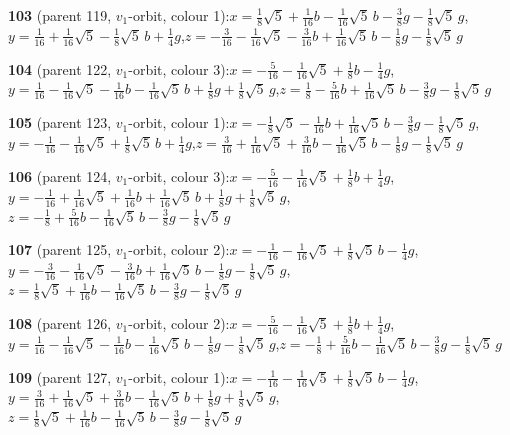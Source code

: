 \documentclass[10pt]{article}
\begin{document}
{\noindent\textbf{103} (parent 119, $v_1$-orbit, colour 1):\quad $x=\tfrac{1}{8}\sqrt5+\tfrac{1}{16}b-\tfrac{1}{16}\sqrt5\,b-\tfrac{3}{8}g-\tfrac{1}{8}\sqrt5\,g$,\quad $y=\tfrac{1}{16}+\tfrac{1}{16}\sqrt5-\tfrac{1}{8}\sqrt5\,b+\tfrac{1}{4}g$,\quad $z=-\tfrac{3}{16}-\tfrac{1}{16}\sqrt5-\tfrac{3}{16}b+\tfrac{1}{16}\sqrt5\,b-\tfrac{1}{8}g-\tfrac{1}{8}\sqrt5\,g$\par\smallskip
\noindent\textbf{104} (parent 122, $v_1$-orbit, colour 3):\quad $x=-\tfrac{5}{16}-\tfrac{1}{16}\sqrt5+\tfrac{1}{8}b-\tfrac{1}{4}g$,\quad $y=\tfrac{1}{16}-\tfrac{1}{16}\sqrt5-\tfrac{1}{16}b-\tfrac{1}{16}\sqrt5\,b+\tfrac{1}{8}g+\tfrac{1}{8}\sqrt5\,g$,\quad $z=\tfrac{1}{8}-\tfrac{5}{16}b+\tfrac{1}{16}\sqrt5\,b-\tfrac{3}{8}g-\tfrac{1}{8}\sqrt5\,g$\par\smallskip
\noindent\textbf{105} (parent 123, $v_1$-orbit, colour 1):\quad $x=-\tfrac{1}{8}\sqrt5-\tfrac{1}{16}b+\tfrac{1}{16}\sqrt5\,b-\tfrac{3}{8}g-\tfrac{1}{8}\sqrt5\,g$,\quad $y=-\tfrac{1}{16}-\tfrac{1}{16}\sqrt5+\tfrac{1}{8}\sqrt5\,b+\tfrac{1}{4}g$,\quad $z=\tfrac{3}{16}+\tfrac{1}{16}\sqrt5+\tfrac{3}{16}b-\tfrac{1}{16}\sqrt5\,b-\tfrac{1}{8}g-\tfrac{1}{8}\sqrt5\,g$\par\smallskip
\noindent\textbf{106} (parent 124, $v_1$-orbit, colour 3):\quad $x=-\tfrac{5}{16}-\tfrac{1}{16}\sqrt5+\tfrac{1}{8}b+\tfrac{1}{4}g$,\quad $y=-\tfrac{1}{16}+\tfrac{1}{16}\sqrt5+\tfrac{1}{16}b+\tfrac{1}{16}\sqrt5\,b+\tfrac{1}{8}g+\tfrac{1}{8}\sqrt5\,g$,\quad $z=-\tfrac{1}{8}+\tfrac{5}{16}b-\tfrac{1}{16}\sqrt5\,b-\tfrac{3}{8}g-\tfrac{1}{8}\sqrt5\,g$\par\smallskip
\noindent\textbf{107} (parent 125, $v_1$-orbit, colour 2):\quad $x=-\tfrac{1}{16}-\tfrac{1}{16}\sqrt5+\tfrac{1}{8}\sqrt5\,b-\tfrac{1}{4}g$,\quad $y=-\tfrac{3}{16}-\tfrac{1}{16}\sqrt5-\tfrac{3}{16}b+\tfrac{1}{16}\sqrt5\,b-\tfrac{1}{8}g-\tfrac{1}{8}\sqrt5\,g$,\quad $z=\tfrac{1}{8}\sqrt5+\tfrac{1}{16}b-\tfrac{1}{16}\sqrt5\,b-\tfrac{3}{8}g-\tfrac{1}{8}\sqrt5\,g$\par\smallskip
\noindent\textbf{108} (parent 126, $v_1$-orbit, colour 2):\quad $x=-\tfrac{5}{16}-\tfrac{1}{16}\sqrt5+\tfrac{1}{8}b+\tfrac{1}{4}g$,\quad $y=\tfrac{1}{16}-\tfrac{1}{16}\sqrt5-\tfrac{1}{16}b-\tfrac{1}{16}\sqrt5\,b-\tfrac{1}{8}g-\tfrac{1}{8}\sqrt5\,g$,\quad $z=-\tfrac{1}{8}+\tfrac{5}{16}b-\tfrac{1}{16}\sqrt5\,b-\tfrac{3}{8}g-\tfrac{1}{8}\sqrt5\,g$\par\smallskip
\noindent\textbf{109} (parent 127, $v_1$-orbit, colour 1):\quad $x=-\tfrac{1}{16}-\tfrac{1}{16}\sqrt5+\tfrac{1}{8}\sqrt5\,b-\tfrac{1}{4}g$,\quad $y=\tfrac{3}{16}+\tfrac{1}{16}\sqrt5+\tfrac{3}{16}b-\tfrac{1}{16}\sqrt5\,b+\tfrac{1}{8}g+\tfrac{1}{8}\sqrt5\,g$,\quad $z=\tfrac{1}{8}\sqrt5+\tfrac{1}{16}b-\tfrac{1}{16}\sqrt5\,b-\tfrac{3}{8}g-\tfrac{1}{8}\sqrt5\,g$\par\smallskip
}
\end{document}
